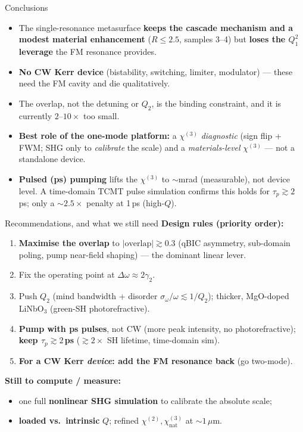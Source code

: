 \documentclass[aspectratio=169,11pt]{beamer}
\newcommand{\chitwo}{\chi^{(2)}}
\newcommand{\chithree}{\chi^{(3)}}
\newcommand{\Dom}{\Delta\omega}
\newcommand{\gtwo}{\gamma_2}
\begin{document}
\begin{frame}{Conclusions}
  \begin{itemize}
    \item The single-resonance metasurface \textbf{keeps the cascade mechanism and a
          modest material enhancement} ($R\!\le\!2.5$, samples 3--4) but
          \textbf{loses the $Q_1^{2}$ leverage} the FM resonance provides.
    \item \textbf{No CW Kerr device} (bistability, switching, limiter, modulator)
          --- these need the FM cavity and die qualitatively.
    \item The overlap, not the detuning or $Q_2$, is the binding constraint, and it
          is currently $2$--$10\times$ too small.
    \item \textbf{Best role of the one-mode platform:} a $\chithree$ \emph{diagnostic}
          (sign flip + FWM; SHG only to \emph{calibrate} the scale) and a
          \emph{materials-level} $\chithree$ --- not a standalone device.
    \item \textbf{Pulsed (ps) pumping} lifts the $\chithree$ to $\sim$mrad (measurable),
          not device level. A time-domain TCMT pulse simulation confirms this holds for
          \alert{$\tau_p\!\gtrsim\!2$\,ps}; only a $\sim\!2.5\times$ penalty at 1\,ps (high-$Q$).
  \end{itemize}
\end{frame}

\begin{frame}{Recommendations, and what we still need}
  \textbf{Design rules (priority order):}
  \begin{enumerate}\footnotesize
    \item \textbf{Maximise the overlap} to $|\mathrm{overlap}|\gtrsim0.3$ (qBIC asymmetry,
          sub-domain poling, pump near-field shaping) --- the dominant linear lever.
    \item Fix the operating point at $\Dom\!\approx\!2\gtwo$.
    \item Push $Q_2$ (mind bandwidth + disorder $\sigma_\omega/\omega\!\lesssim\!1/Q_2$);
          thicker, MgO-doped LiNbO$_3$ (green-SH photorefractive).
    \item \textbf{Pump with ps pulses}, not CW (more peak intensity, no photorefractive);
          \textbf{keep $\tau_p\!\gtrsim\!2$\,ps} ($\gtrsim2\times$ SH lifetime, time-domain sim).
    \item \textbf{For a CW Kerr \emph{device}: add the FM resonance back} (go two-mode).
  \end{enumerate}
  \textbf{Still to compute / measure:}
  \begin{itemize}\footnotesize
    \item one full \textbf{nonlinear SHG simulation} to calibrate the absolute scale;
    \item \textbf{loaded vs.\ intrinsic} $Q$; refined $\chitwo,\chithree_{\mathrm{nat}}$ at $\sim\!1\,\mu$m.
  \end{itemize}
\end{frame}
\end{document}
